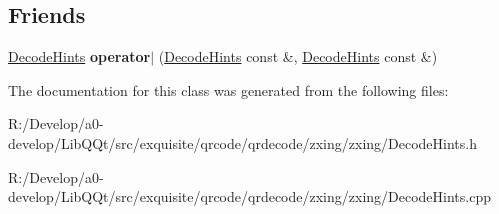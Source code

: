 \subsection*{Friends}
\begin{DoxyCompactItemize}
\item 
\mbox{\label{classzxing_1_1_decode_hints_aa030a225216e9f31d122b01464259e84}} 
\mbox{\hyperlink{classzxing_1_1_decode_hints}{Decode\+Hints}} {\bfseries operator$\vert$} (\mbox{\hyperlink{classzxing_1_1_decode_hints}{Decode\+Hints}} const \&, \mbox{\hyperlink{classzxing_1_1_decode_hints}{Decode\+Hints}} const \&)
\end{DoxyCompactItemize}


The documentation for this class was generated from the following files\+:\begin{DoxyCompactItemize}
\item 
R\+:/\+Develop/a0-\/develop/\+Lib\+Q\+Qt/src/exquisite/qrcode/qrdecode/zxing/zxing/Decode\+Hints.\+h\item 
R\+:/\+Develop/a0-\/develop/\+Lib\+Q\+Qt/src/exquisite/qrcode/qrdecode/zxing/zxing/Decode\+Hints.\+cpp\end{DoxyCompactItemize}

